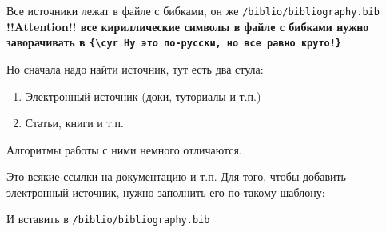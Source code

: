 \newpage
{}
Все источники лежат в файле с бибками, он же \texttt{/biblio/bibliography.bib}\\
\textbf{!!Attention!! все кириллические символы в файле с бибками нужно заворачивать в \texttt{\{\textbackslash cyr Ну это по-русски, но все равно круто!\}}}

Но сначала надо найти источник, тут есть два стула:
\begin{enumerate}
    \item Электронный источник (доки, туториалы и т.п.)
    \item Статьи, книги и т.п.
\end{enumerate}
Алгоритмы работы с ними немного отличаются.

Это всякие ссылки на документацию и т.п.
Для того, чтобы добавить электронный источник, нужно заполнить его по такому шаблону:

И вставить в \texttt{/biblio/bibliography.bib}

